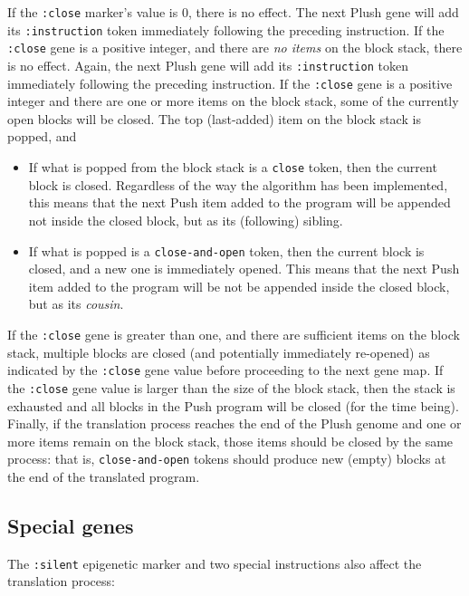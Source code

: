 \documentclass[graybox]{svmult}
\begin{document}
If the \texttt{:close} marker's value is 0, there is no effect. The next Plush gene will add its \texttt{:instruction} token immediately following the preceding instruction.
If the \texttt{:close} gene is a positive integer, and there are \textit{no items} on the block stack, there is no effect. Again, the next Plush gene will add its \texttt{:instruction} token immediately following the preceding instruction.
If the \texttt{:close} gene is a positive integer and there are one or more items on the block stack, some of the currently open blocks will be closed. The top (last-added) item on the block stack is popped, and

\begin{itemize}

\item If what is popped from the block stack is a \texttt{close} token, then the current block is closed. Regardless of the way the algorithm has been implemented, this means that the next Push item added to the program will be appended not inside the closed block, but as its (following) sibling.
\item If what is popped is a \texttt{close-and-open} token, then the current block is closed, and a new one is immediately opened. This means that the next Push item added to the program will be not be appended inside the closed block, but as its \textit{cousin}.
\end{itemize}

If the \texttt{:close} gene is greater than one, and there are sufficient items on the block stack, multiple blocks are closed (and potentially immediately re-opened) as indicated by the \texttt{:close} gene value before proceeding to the next gene map.
If the \texttt{:close} gene value is larger than the size of the block stack, then the stack is exhausted and all blocks in the Push program will be closed (for the time being).
Finally, if the translation process reaches the end of the Plush genome and one or more items remain on the block stack, those items should be closed by the same process: that is, \texttt{close-and-open} tokens should produce new (empty) blocks at the end of the translated program.

\subsection{Special genes}
\label{special-instructions}

The \texttt{:silent} epigenetic marker and two special instructions also affect the translation process:
\end{document}
